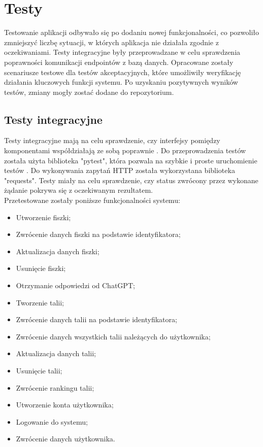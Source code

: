 \chapter{Testy}
Testowanie aplikacji odbywało się po dodaniu nowej funkcjonalności, co pozwoliło zmniejszyć liczbę sytuacji, w których aplikacja nie działała zgodnie z oczekiwaniami. Testy integracyjne były przeprowadzane w celu sprawdzenia  poprawności komunikacji endpointów z  bazą danych. Opracowane zostały scenariusze testowe dla testów akceptacyjnych,  które umożliwiły  weryfikację działania kluczowych funkcji systemu. Po uzyskaniu pozytywnych wyników testów, zmiany mogły zostać dodane do repozytorium.


\section{Testy integracyjne}

Testy integracyjne mają na celu sprawdzenie, czy interfejsy pomiędzy komponentami współdziałają ze sobą poprawnie \cite{mielnikIntegrationTests}. Do przeprowadzenia testów została użyta biblioteka "pytest", która pozwala na szybkie i proste uruchomienie testów \cite{oliveira2018}. Do wykonywania zapytań HTTP została wykorzystana biblioteka "requests". Testy miały na celu sprawdzenie, czy status zwrócony przez wykonane żądanie pokrywa się z oczekiwanym rezultatem.\\
Przetestowane zostały poniższe funkcjonalności systemu:

\begin{itemize}
    \item Utworzenie fiszki;
    \item Zwrócenie danych fiszki na podstawie identyfikatora;
    \item Aktualizacja danych fiszki;
    \item Usunięcie fiszki;
    \item Otrzymanie odpowiedzi od ChatGPT;
    \item Tworzenie talii;
    \item Zwrócenie danych talii na podstawie identyfikatora;
    \item Zwrócenie danych wszystkich talii należących do użytkownika;
    \item Aktualizacja danych talii;
    \item Usunięcie talii;
    \item Zwrócenie rankingu talii;
    \item Utworzenie konta użytkownika;
    \item Logowanie do systemu;
    \item Zwrócenie danych użytkownika.
\end{itemize}

